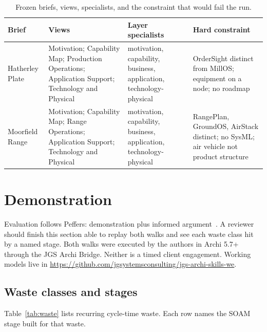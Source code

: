 \documentclass[10pt,journal,compsoc]{IEEEtran}
\begin{document}
\begin{table}[!t]
\caption{Frozen briefs, views, specialists, and the constraint that would fail the run.}
\label{tab:briefs}
\centering
{\small
\begin{tabularx}{\textwidth}{@{}>{\raggedright\arraybackslash}p{} >{\raggedright\arraybackslash}p{} >{\raggedright\arraybackslash}p{} >{\raggedright\arraybackslash}X@{}}
\toprule
\textbf{Brief} & \textbf{Views} & \textbf{Layer specialists} & \textbf{Hard constraint} \\
\midrule
Hatherley Plate & Motivation; Capability Map; Production Operations; Application Support; Technology and Physical & motivation, capability, business, application, technology-physical & OrderSight distinct from MillOS; equipment on a node; no roadmap \\
Moorfield Range & Motivation; Capability Map; Range Operations; Application Support; Technology and Physical & motivation, capability, business, application, technology-physical & RangePlan, GroundOS, AirStack distinct; no SysML; air vehicle not product structure \\
\bottomrule
\end{tabularx}}
\end{table}

\section{Demonstration}
\label{sec:demo}

Evaluation follows Peffers: demonstration plus informed argument~\cite{peffers2007}. A reviewer should finish this section able to replay both walks and see each waste class hit by a named stage. Both walks were executed by the authors in Archi 5.7+ through the JGS Archi Bridge. Neither is a timed client engagement. Working models live in \url{https://github.com/jgsystemsconsulting/jgs-archi-skills-we}.

\subsection{Waste classes and stages}

Table~\ref{tab:waste} lists recurring cycle-time waste. Each row names the SOAM stage built for that waste.
\end{document}
